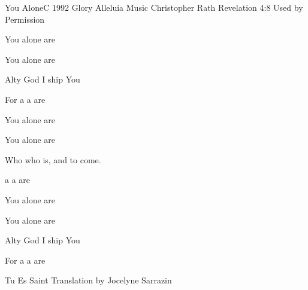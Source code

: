 \documentclass[12pt]{book}
\newcommand{\RevDate}{\today}
\begin{document}
\begin{song}{You Alone}{C}
  {1992 Glory Alleluia Music}
  {Christopher Rath}
  {Revelation 4:8}
  {Used by Permission}

  \renewcommand{\RevDate}{February~11,~1993}

  \begin{SBVerse}
       You alone are 

       You alone are 

    Alty God I ship You

    For  a  a are   
  \end{SBVerse}

  \begin{SBVerse}
      You alone are 

      You alone are 

    Who  who is, and  to come.

     a  a are  \Ch{[}{}\Ch{]}{} \Ch{[{$^{Mod.}$}}{}\Ch{]}{}
  \end{SBVerse}

  \begin{SBExtraKeys}{%

    \begin{SBVerse}
         You alone are 

         You alone are 

      Alty God I ship You

      For  a  a are   
    \end{SBVerse}
  }\end{SBExtraKeys}

\CBPageBrk
  \begin{xlatn}{Tu Es Saint}
    {}
    {Translation by Jocelyne Sarrazin}
    \renewcommand{\RevDate}{8~April,~1998}


\end{xlatn}
\end{song}
\end{document}
